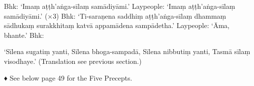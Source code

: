 Bhk: ‘Imaṃ aṭṭh'aṅga-sīlaṃ samādiyāmi.’
Laypeople: ‘Imaṃ aṭṭh'aṅga-sīlaṃ
samādiyāmi.’ (×3)
Bhk: ‘Ti-saraṇena saddhiṃ aṭṭh'aṅga-sīlaṃ
dhammaṃ sādhukaṃ surakkhitaṃ katvā
appamādena sampādetha.’
Laypeople: ‘Āma, bhante.’
Bhk:

‘Sīlena sugatiṃ yanti,
Sīlena bhoga-sampadā,
Sīlena nibbutiṃ yanti,
Tasmā sīlaṃ visodhaye.’
(Translation see previous section.)

♦ See below page 49 for the Five Precepts.

